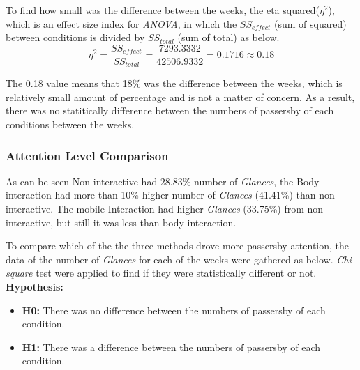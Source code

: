 To find how small was the difference between the weeks, the eta squared(${\eta}^2$), which is an effect size index for \emph{ANOVA}, in which the $SS_{effect}$ (sum of squared) between conditions is divided by $SS_{total}$  (sum of total) as below.
\[
{\eta}^2 = \frac{{SS}_{effect}}{{SS}_{total}} = \frac{7293.3332}{42506.9332} = 0.1716\approx 0.18
\]

The 0.18 value means that 18\% was the difference between the weeks, which is relatively small amount of percentage and is not a matter of concern. As a result, there was no statitically difference between the numbers of passersby of each conditions between the weeks.




\subsubsection {Attention Level Comparison}
As can be seen Non-interactive had 28.83\% number of \emph{Glances}, the Body-interaction had more than 10\% higher number of \emph{Glances} (41.41\%) than non-interactive. The mobile Interaction had higher \emph{Glances} (33.75\%) from non-interactive, but still it was less than body interaction. 

To compare which of the the three methods drove more passersby attention, the data of the number of \emph{Glances} for each of the weeks were gathered as below. \emph{Chi square} test were applied to find if they were statistically different or not.\\

\textbf{Hypothesis: }
\begin{itemize}
\item \textbf{H0:} There was no difference between the numbers of passersby of each condition.
\item \textbf{H1:} There was a difference between the numbers of passersby of each condition.
\end{itemize}

\begin{table}[H]
\caption{Cross tabulation for each week attention level }
\label{tab:crosstabulationweeks}
\centering
{}
\end{table}


